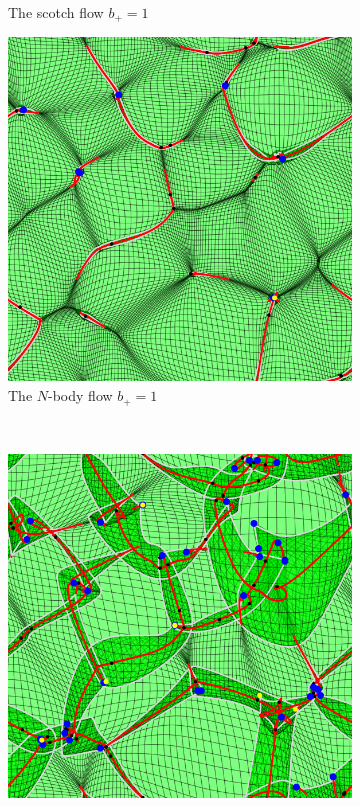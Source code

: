 \documentclass[a4paper, 11pt]{article}
\begin{document}
\begin{figure}
\begin{subfigure}[b]{0.32\textwidth}
\caption{The scotch flow $b_+=1$}
\end{subfigure}
\begin{subfigure}[b]{0.32\textwidth}
\includegraphics[width=\textwidth]{Visual_Nbody_D=1}
\caption{The $N$-body flow $b_+=1$}
\end{subfigure}\\
\begin{subfigure}[b]{0.32\textwidth}
\includegraphics[width=\textwidth]{Visual_Zeldovich_D=2}

\end{subfigure}
\end{figure}
\end{document}
